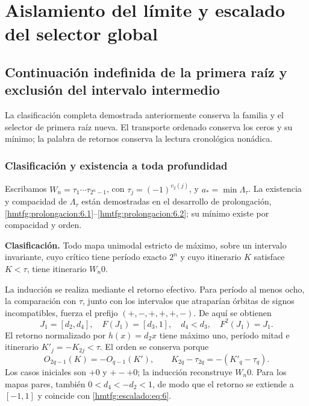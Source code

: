 \section{Aislamiento del límite y escalado del selector global}
\label{hmtfg:fragmento:aislamiento-del-limite-y-escalado-del-selector-global}

\subsection{Continuación indefinida de la primera raíz y exclusión del intervalo intermedio}
\label{hmtfg:escalado:15}

La clasificación completa demostrada anteriormente conserva la familia y el selector de primera raíz nueva. El transporte ordenado conserva los ceros y su mínimo; la palabra de retornos conserva la lectura cronológica nonádica.

\subsubsection{Clasificación y existencia a toda profundidad}
\label{hmtfg:escalado:15.1}

Escribamos \(W_n=\tau_1\cdots\tau_{2^n-1}\), con \(\tau_j=(-1)^{v_2(j)}\), y \(a_*=\min\Lambda_\tau\). La existencia y compacidad de \(\Lambda_\tau\) están demostradas en el desarrollo de prolongación, \ref{hmtfg:prolongacion:6.1}–\ref{hmtfg:prolongacion:6.2}; su mínimo existe por compacidad y orden.

\textbf{Clasificación.} Todo mapa unimodal estricto de máximo, sobre un intervalo invariante, cuyo crítico tiene período exacto \(2^n\) y cuyo itinerario \(K\) satisface \(K<\tau\), tiene itinerario \(W_n0\).

La inducción se realiza mediante el retorno efectivo. Para período al menos ocho, la comparación con \(\tau\), junto con los intervalos que atraparían órbitas de signos incompatibles, fuerza el prefijo \((+,-,+,+,+,-)\). De aquí se obtienen
\[
J_1=[d_2,d_4],\quad F(J_1)=[d_3,1],\quad
d_4<d_3,\quad F^2(J_1)=J_1.
\]
El retorno normalizado por \(h(x)=d_2x\) tiene máximo uno, período mitad e itinerario \(K'_j=-K_{2j}<\tau\). El orden se conserva porque
\[
O_{2q-1}(K)=-O_{q-1}(K'),\qquad
K_{2q}-\tau_{2q}=-(K'_q-\tau_q).
\]
Los casos iniciales son \(+0\) y \(+-+0\); la inducción reconstruye \(W_n0\). Para los mapas pares, también \(0<d_4<-d_2<1\), de modo que el retorno se extiende a \([-1,1]\) y coincide con \eqref{hmtfg:escalado:eq:6}.

